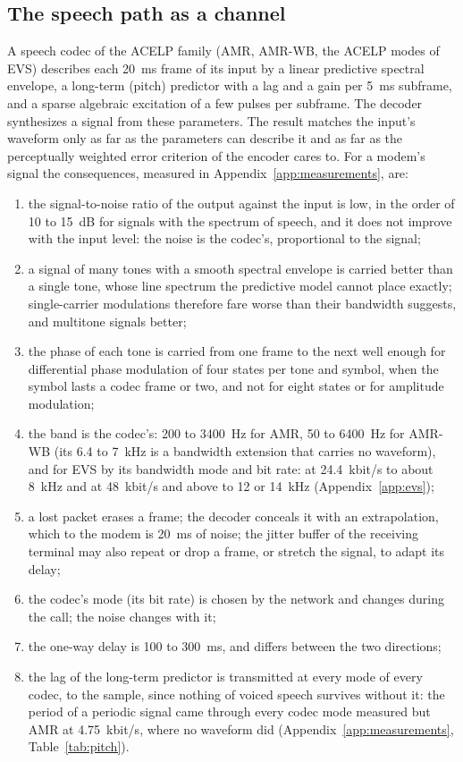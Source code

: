 \documentclass[a4paper,11pt]{article}
\newcommand{\kbs}{kbit/s}
\begin{document}
\subsection{The speech path as a channel}
A speech codec of the ACELP family (AMR, AMR-WB, the ACELP modes of EVS)
describes each 20~ms frame of its input by a linear predictive spectral
envelope, a long-term (pitch) predictor with a lag and a gain per 5~ms
subframe, and a sparse algebraic excitation of a few pulses per subframe.
The decoder synthesizes a signal from these parameters.  The result
matches the input's waveform only as far as the parameters can describe
it and as far as the perceptually weighted error criterion of the encoder
cares to.  For a modem's signal the consequences, measured in
Appendix~\ref{app:measurements}, are:
\begin{enumerate}[label=\alph*)]
\item the signal-to-noise ratio of the output against the input is low,
  in the order of 10 to 15~dB for signals with the spectrum of speech,
  and it does not improve with the input level: the noise is the codec's,
  proportional to the signal;
\item a signal of many tones with a smooth spectral envelope is carried
  better than a single tone, whose line spectrum the predictive model
  cannot place exactly; single-carrier modulations therefore fare worse
  than their bandwidth suggests, and multitone signals better;
\item the phase of each tone is carried from one frame to the next well
  enough for differential phase modulation of four states per tone and
  symbol, when the symbol lasts a codec frame or two, and not for eight
  states or for amplitude modulation;
\item the band is the codec's: 200 to 3400~Hz for AMR, 50 to 6400~Hz for
  AMR-WB (its 6.4 to 7~kHz is a bandwidth extension that carries no
  waveform), and for EVS by its bandwidth mode and bit rate: at
  24.4~\kbs{} to about 8~kHz and at 48~\kbs{} and above to 12 or 14~kHz
  (Appendix~\ref{app:evs});
\item a lost packet erases a frame; the decoder conceals it with an
  extrapolation, which to the modem is 20~ms of noise; the jitter buffer
  of the receiving terminal may also repeat or drop a frame, or stretch
  the signal, to adapt its delay;
\item the codec's mode (its bit rate) is chosen by the network and
  changes during the call; the noise changes with it;
\item the one-way delay is 100 to 300~ms, and differs between the two
  directions;
\item the lag of the long-term predictor is transmitted at every mode of
  every codec, to the sample, since nothing of voiced speech survives
  without it: the period of a periodic signal came through every codec
  mode measured but AMR at 4.75~\kbs{}, where no waveform did
  (Appendix~\ref{app:measurements}, Table~\ref{tab:pitch}).
\end{enumerate}
\end{document}
